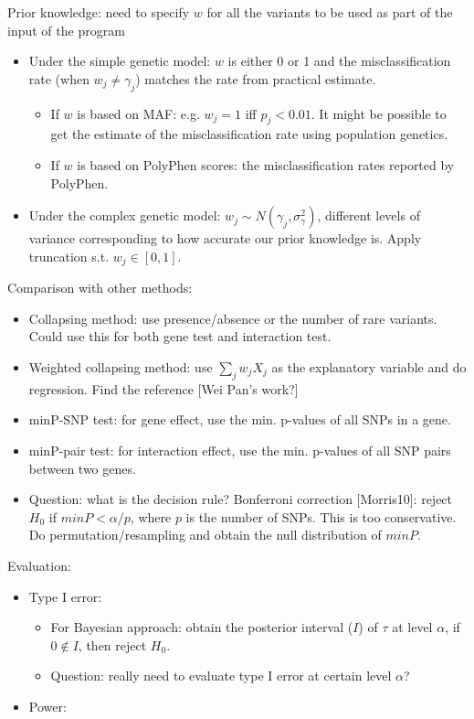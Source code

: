 \documentclass[11pt]{article}
\begin{document}
\begin{enumerate}
Prior knowledge: need to specify $w$ for all the variants to be used as part of the input of the program
\begin{itemize}
\item Under the simple genetic model: $w$ is either 0 or 1 and the misclassification rate (when $w_j \neq \gamma_j$) matches the rate from practical estimate. 
\begin{itemize}
\item If $w$ is based on MAF: e.g. $w_j = 1$ iff $p_j < 0.01$. It might be possible to get the estimate of the misclassification rate using population genetics. 
\item If $w$ is based on PolyPhen scores: the misclassification rates reported by PolyPhen. 
\end{itemize}

\item Under the complex genetic model: $w_j \sim N(\gamma_j, \sigma_{\gamma}^2)$, different levels of variance corresponding to how accurate our prior knowledge is. Apply truncation s.t. $w_j \in [0,1]$. 
\end{itemize}

Comparison with other methods: 
\begin{itemize}
\item Collapsing method: use presence/absence or the number of rare variants. Could use this for both gene test and interaction test. 
\item Weighted collapsing method: use $\sum_j w_j X_j$ as the explanatory variable and do regression. Find the reference [Wei Pan's work?]
\item minP-SNP test: for gene effect, use the min. p-values of all SNPs in a gene. 
\item minP-pair test: for interaction effect, use the min. p-values of all SNP pairs between two genes.  
\item Question: what is the decision rule? Bonferroni correction [Morris10]: reject $H_0$ if $minP < \alpha/p$, where $p$ is the number of SNPs. This is too conservative. Do permutation/resampling and obtain the null distribution of $minP$. 
\end{itemize}

Evaluation: 
\begin{itemize}
\item Type I error: 
\begin{itemize}
\item For Bayesian approach: obtain the posterior interval ($I$) of $\tau$ at level $\alpha$, if $0 \notin I$, then reject $H_0$. 
\item Question: really need to evaluate type I error at certain level $\alpha$? 
\end{itemize}
\item Power:
\end{itemize}


\end{enumerate}
\end{document}
